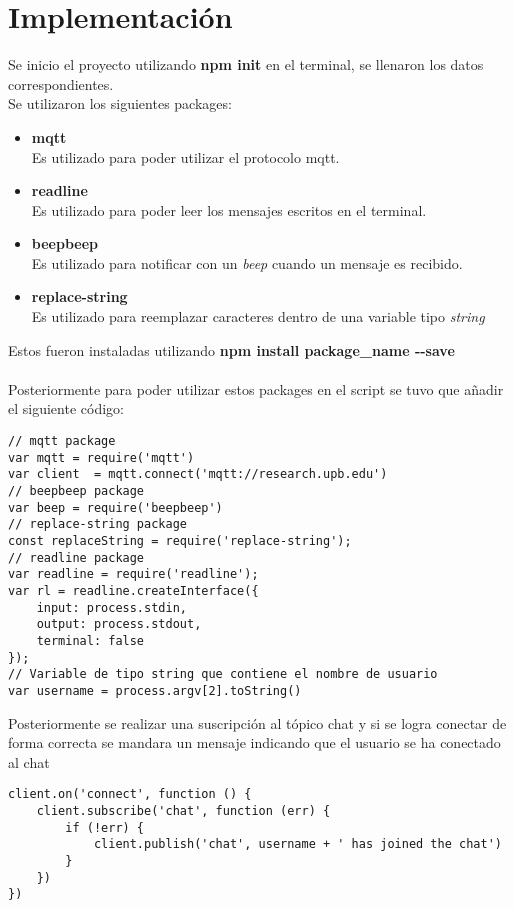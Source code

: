 \documentclass{article}
\begin{document}
\section{Implementaci\'on}
Se inicio el proyecto utilizando {\selectfont\textbf{npm init}} en el terminal, se llenaron los datos correspondientes.
\\
Se utilizaron los siguientes packages:
\begin{itemize}
	\item \textbf{mqtt}
	\\
	Es utilizado para poder utilizar el protocolo mqtt.
	\item \textbf{readline}
	\\
	Es utilizado para poder leer los mensajes escritos en el terminal.
	\item \textbf{beepbeep}
	\\
	Es utilizado para notificar con un \textit{beep} cuando un mensaje es recibido.
	\item \textbf{replace-string}
	\\
	Es utilizado para reemplazar caracteres dentro de una variable tipo \textit{string}
\end{itemize}
Estos fueron instaladas utilizando {\selectfont\textbf{npm install package\_name -{}-save}}
\\~\\
Posteriormente para poder utilizar estos packages en el script se tuvo que añadir el siguiente c\'odigo:
\begin{verbatim}
// mqtt package
var mqtt = require('mqtt')
var client  = mqtt.connect('mqtt://research.upb.edu')
// beepbeep package
var beep = require('beepbeep')
// replace-string package
const replaceString = require('replace-string');
// readline package
var readline = require('readline');
var rl = readline.createInterface({
	input: process.stdin,
	output: process.stdout,
	terminal: false
});
// Variable de tipo string que contiene el nombre de usuario
var username = process.argv[2].toString()
\end{verbatim}
\noindent Posteriormente se realizar una suscripci\'on al t\'opico chat y si se logra conectar de forma correcta se mandara un mensaje indicando que el usuario se ha conectado al chat
\begin{verbatim}
client.on('connect', function () {
	client.subscribe('chat', function (err) {
		if (!err) {
			client.publish('chat', username + ' has joined the chat')
		}
	})
})
\end{verbatim}
\end{document}
